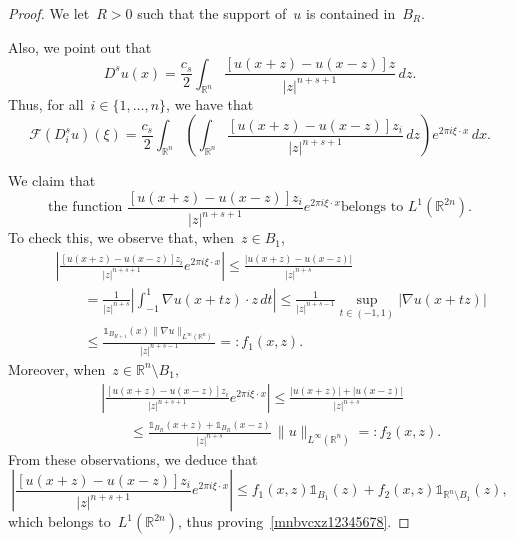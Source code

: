 \documentclass[11pt,hyp,]{nyjm}
\numberwithin{equation}{section}
\newcommand{\R}{\mathbb{R}}
\theoremstyle{remark}
\newcommand{\Int}{\int_{\mathbb{R}^n}}
\renewcommand{\le}{\leqslant}
\begin{document}
			\begin{proof}
We let~$R>0$ such that the support of~$u$ is contained in~$B_R$.			
			
Also, we point out that 
$$
D^s u(x) =  \frac{c_s}{2}  \Int \frac{[u(x+z)-u(x-z)]z}{|z|^{n+s+1}} \, dz.
$$
Thus, for all~$i\in\{1,\ldots,n\}$, we have that
\begin{equation}\label{mnbvcxz123456780}
{\mathcal{F}}(D^s_iu)(\xi)=\frac{c_s}2 \int_{\R^n}
\left(\Int \frac{[u(x+z)-u(x-z)]z_i}{|z|^{n+s+1}} \, dz\right)e^{2\pi i\xi\cdot x}\,dx.
\end{equation}

We claim that
\begin{equation}\label{mnbvcxz12345678}
{\mbox{the function~$\frac{[u(x+z)-u(x-z)]z_i}{|z|^{n+s+1}} e^{2\pi i\xi\cdot x}$
belongs to~$L^1(\R^{2n})$.}}
\end{equation}
To check this, we observe that, when~$z\in B_1$,
\begin{eqnarray*}&&
\left| \frac{[u(x+z)-u(x-z)]z_i}{|z|^{n+s+1}} e^{2\pi i\xi\cdot x}\right|\le
\frac{|u(x+z)-u(x-z)|}{|z|^{n+s}}\\ &&\qquad
=\frac{1}{|z|^{n+s}}\left|\int_{-1}^1 \nabla u(x+tz)\cdot z\,dt\right|\le
\frac{1}{|z|^{n+s-1}}\sup_{t\in(-1,1)}|\nabla u(x+tz)|\\
&&\qquad \le \frac{\mathds{1}_{B_{R+1}}(x)\|\nabla u\|_{L^\infty(\R^n)}  }{|z|^{n+s-1}}
=: f_1(x,z).
\end{eqnarray*}
Moreover, when~$z\in\R^n\setminus B_1$,
\begin{eqnarray*}
&&
\left| \frac{[u(x+z)-u(x-z)]z_i}{|z|^{n+s+1}} e^{2\pi i\xi\cdot x}\right|\le
\frac{|u(x+z)|+|u(x-z)|}{|z|^{n+s}}\\&&\qquad \le
\frac{\mathds{1}_{B_R}(x+z)+\mathds{1}_{B_R}(x-z)}{|z|^{n+s}}\,\|u\|_{L^\infty(\R^n)}
=: f_2(x,z).
\end{eqnarray*}
{F}rom these observations, we deduce that
$$ \left| \frac{[u(x+z)-u(x-z)]z_i}{|z|^{n+s+1}} e^{2\pi i\xi\cdot x}\right|\le f_1(x,z)
\mathds{1}_{B_1}(z)+ f_2(x,z)\mathds{1}_{\R^n\setminus B_1}(z),$$
which belongs to~$L^1(\R^{2n})$, thus proving~\eqref{mnbvcxz12345678}.


\end{proof}
\end{document}
